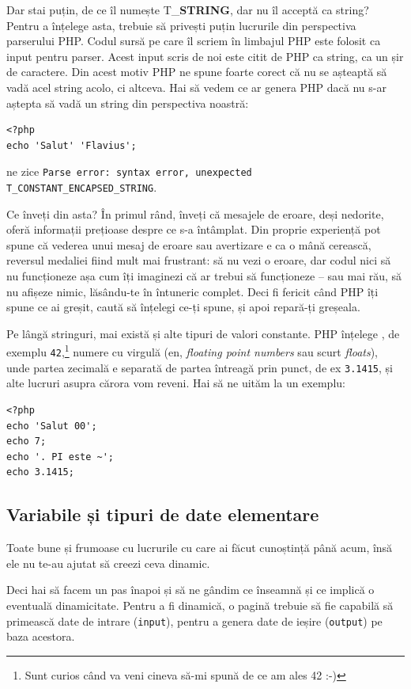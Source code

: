 Dar stai puțin, de ce îl numește {\glqq}T\_\textbf{STRING}{\grqq}, dar nu îl acceptă ca string?
Pentru a înțelege asta, trebuie să privești puțin lucrurile din perspectiva parserului
PHP. Codul sursă pe care îl scriem în limbajul PHP este folosit ca input pentru
parser. Acest input scris de noi este citit de PHP ca string, ca un șir de caractere.
Din acest motiv PHP ne spune foarte corect că nu se așteaptă să vadă acel string acolo,
ci altceva.
Hai să vedem ce ar genera PHP dacă nu s-ar aștepta să vadă un string
din perspectiva noastră:
\begin{lstlisting}
<?php
echo 'Salut' 'Flavius';
\end{lstlisting}
ne zice \texttt{Parse error: syntax error, unexpected T\_CONSTANT\_ENCAPSED\_STRING}.

Ce înveți din asta? În primul rând, înveți că mesajele de eroare, deși nedorite,
oferă informații prețioase despre ce s-a întâmplat. Din proprie experiență
pot spune că vederea unui mesaj de eroare sau avertizare e ca o mână cerească,
reversul medaliei fiind mult mai frustrant: să nu vezi o eroare, dar codul
nici să nu funcționeze așa cum îți imaginezi că ar trebui să funcționeze -- sau
mai rău, să nu afișeze nimic, lăsându-te în întuneric complet. Deci fi fericit
când PHP îți spune ce ai greșit, caută să înțelegi ce-ți spune, și apoi
repară-ți greșeala.

Pe lângă stringuri, mai există și alte tipuri de valori constante. PHP înțelege
, de exemplu \texttt{42},\footnote{Sunt curios
când va veni cineva să-mi spună de ce am ales 42 :-)}
numere cu virgulă (en, \textsl{floating point numbers} sau scurt \textsl{floats}),
unde partea zecimală
e separată de partea întreagă prin punct, de ex \texttt{3.1415}, și alte lucruri
asupra cărora vom reveni. Hai să ne uităm la un exemplu:
\begin{lstlisting}
<?php
echo 'Salut 00';
echo 7;
echo '. PI este ~';
echo 3.1415;
\end{lstlisting}

\subsection{Variabile și tipuri de date elementare}
Toate bune și frumoase cu lucrurile cu care ai făcut cunoștință
până acum, însă ele nu te-au ajutat să creezi ceva dinamic.

Deci hai să facem un pas înapoi și să ne gândim ce înseamnă și
ce implică o eventuală dinamicitate. Pentru a fi dinamică, o
pagină trebuie să fie capabilă să primească date de intrare (\texttt{input}),
pentru a genera date de ieșire (\texttt{output}) pe baza acestora.

